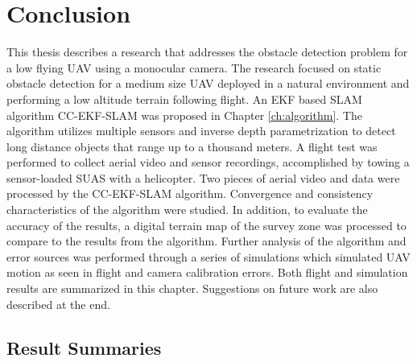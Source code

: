 \chapter{Conclusion}\label{ch:conclusion}
This thesis describes a research that addresses the obstacle detection
problem for a low flying UAV using a monocular camera. The research
focused on static obstacle detection for a medium size UAV deployed in
a natural environment and performing a low altitude terrain following
flight. An EKF based SLAM algorithm CC-EKF-SLAM was proposed in
Chapter \ref{ch:algorithm}. The algorithm utilizes multiple sensors
and inverse depth parametrization to detect long distance objects
that range up to a thousand meters. A flight test was performed to
collect aerial video and sensor recordings, accomplished by towing a
sensor-loaded SUAS with a helicopter. Two pieces of aerial video and
data were processed by the CC-EKF-SLAM algorithm. Convergence and
consistency characteristics of the algorithm were studied. In addition, to
evaluate the accuracy of the results, a digital terrain map of the
survey zone was processed to compare to the results from the algorithm.
Further analysis of the algorithm and error sources was performed
through a series of simulations which simulated UAV motion as seen in
flight and camera calibration errors. Both flight and simulation
results are summarized in this chapter. Suggestions on future work
are also described at the end.

\section{Result Summaries}
